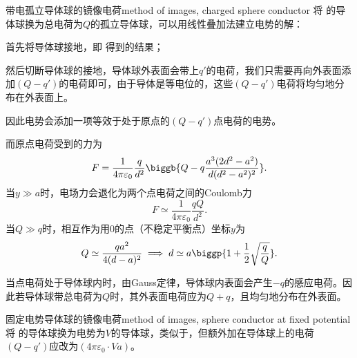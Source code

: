 \begin{example}{带电孤立导体球的镜像电荷}{method of images, charged sphere conductor}
    将 的导体球换为总电荷为$Q$的孤立导体球，可以用线性叠加法建立电势的解：
    \begin{compactenum}
        \item 首先将导体球接地，即 得到的结果；
        \item 然后切断导体球的接地，导体球外表面会带上$q'$的电荷，我们只需要再向外表面添加$(Q-q')$的电荷即可，由于导体是等电位的，这些$(Q-q')$电荷将均匀地分布在外表面上。
    \end{compactenum}
    因此电势会添加一项等效于处于原点的$(Q-q')$点电荷的电势。
    
    而原点电荷受到的力为
    \begin{equation}
        F=\frac1{4\pi\varepsilon_0}\frac q{d^2}\biggb{Q-q\frac{a^3(2d^2-a^2)}{d(d^2-a^2)^2}}.
    \end{equation}
    当$y\gg a$时，电场力会退化为两个点电荷之间的Coulomb力
    \[
        F\simeq\frac1{4\pi\varepsilon_0}\frac{qQ}{d^2}.
    \]
    当$Q\gg q$时，相互作为用0的点（不稳定平衡点）坐标$y$为
    \begin{equation}
        Q\simeq\frac{qa^2}{4(d-a)^2}\implies d\simeq a\biggp{1+\frac12\sqrt{\frac qQ}}.
    \end{equation}
\end{example}
\begin{remark}
    当点电荷处于导体球内时，由Gauss定律，导体球内表面会产生$-q$的感应电荷。因此若导体球带总电荷为$Q$时，其外表面电荷应为$Q+q$，且均匀地分布在外表面。
\end{remark}
\begin{example}{固定电势导体球的镜像电荷}{method of images, sphere conductor at fixed potential}
    将 的导体球换为电势为$V$的导体球，类似于，但额外加在导体球上的电荷$(Q-q')$应改为$(4\pi\varepsilon_0\cdot Va)$。
\end{example}
